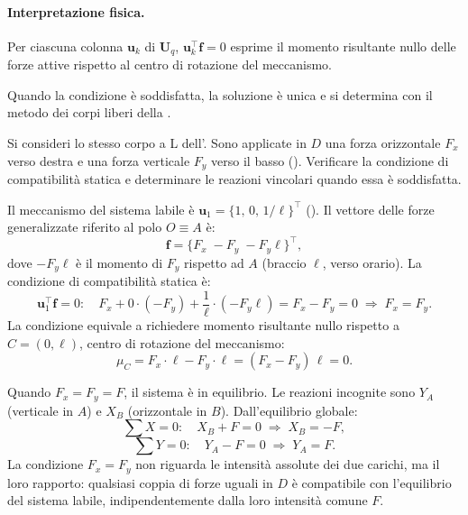 \paragraph{Interpretazione fisica.}
Per ciascuna colonna $\bm{u}_k$ di $\bm{U}_q$,
$\bm{u}_k^{\top}\bm{f} = 0$ esprime il momento risultante nullo
delle forze attive rispetto al centro di rotazione del
meccanismo.

Quando la condizione è soddisfatta, la soluzione è unica e si
determina con il metodo dei corpi liberi della
.

\begin{esempio}
	\label{ex:labile_L_stat}
	Si consideri lo stesso corpo a L
	dell'. Sono applicate in $D$
	una forza orizzontale $F_x$ verso destra e una
	forza verticale $F_y$ verso il basso
	(). Verificare la
	condizione di compatibilità statica e determinare
	le reazioni vincolari quando essa è soddisfatta.
	



	
	\begin{svolgimento}
		
		Il meccanismo del sistema labile è
		$\bm{u}_1 = \{1,\, 0,\, 1/\ell\}^\top$
		(). Il vettore delle forze
		generalizzate riferito al polo $O \equiv A$ è:
		\begin{equation*}
			\bm{f} =
			\bigl\{F_x\; -F_y\; -F_y\ell
			\bigr\}^\top,
		\end{equation*}
		dove $-F_y\ell$ è il momento di $F_y$ rispetto
		ad $A$ (braccio $\ell$, verso orario). La
		condizione di compatibilità statica è:
		\begin{equation*}
			\bm{u}_1^\top\bm{f} = 0:\quad
			F_x + 0 \cdot(-F_y) +
			\frac{1}{\ell}\cdot(-F_y\ell) =
			F_x - F_y = 0
			\;\Longrightarrow\;
			F_x = F_y.
		\end{equation*}
		La condizione equivale a richiedere momento
		risultante nullo rispetto a $C = (0,\ell)$,
		centro di rotazione del meccanismo:
		\begin{equation*}
			\mu_C = F_x\cdot\ell - F_y\cdot\ell =
			(F_x - F_y)\,\ell = 0.
		\end{equation*}
		
		Quando $F_x = F_y = F$, il sistema è in
		equilibrio. Le reazioni incognite sono $Y_A$
		(verticale in $A$) e $X_B$ (orizzontale in $B$).
		Dall'equilibrio globale:
		\begin{equation*}
			\sum X = 0:\quad X_B + F = 0
			\;\Longrightarrow\; X_B = -F,
		\end{equation*}
		\begin{equation*}
			\sum Y = 0:\quad Y_A - F = 0
			\;\Longrightarrow\; Y_A = F.
		\end{equation*}
		La condizione $F_x = F_y$ non riguarda le
		intensità assolute dei due carichi, ma il
		loro rapporto: qualsiasi coppia di forze
		uguali in $D$ è compatibile con l'equilibrio
		del sistema labile, indipendentemente dalla
		loro intensità comune $F$.
		

\end{svolgimento}
\end{esempio}

